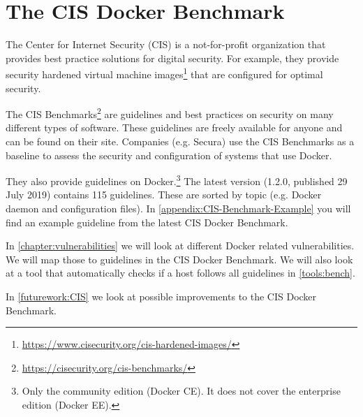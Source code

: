 \section{The CIS Docker Benchmark}
The Center for Internet Security (CIS) is a not-for-profit organization that provides best practice solutions for digital security. For example, they provide security hardened virtual machine images\footnote{\url{https://www.cisecurity.org/cis-hardened-images/}} that are configured for optimal security.

\medskip

The CIS Benchmarks\footnote{\url{https://cisecurity.org/cis-benchmarks/}} are guidelines and best practices on security on many different types of software. These guidelines are freely available for anyone and can be found on their site. Companies (e.g. Secura) use the CIS Benchmarks as a baseline to assess the security and configuration of systems that use Docker.

\medskip

They also provide guidelines on Docker.\footnote{Only the community edition (Docker CE). It does not cover the enterprise edition (Docker EE).} The latest version (1.2.0, published 29 July 2019) contains 115 guidelines. These are sorted by topic (e.g. Docker daemon and configuration files). In \autoref{appendix:CIS-Benchmark-Example} you will find an example guideline from the latest CIS Docker Benchmark.

In \autoref{chapter:vulnerabilities} we will look at different Docker related vulnerabilities. We will map those to guidelines in the CIS Docker Benchmark. We will also look at a tool that automatically checks if a host follows all guidelines in \autoref{tools:bench}.

In \autoref{futurework:CIS} we look at possible improvements to the CIS Docker Benchmark.
